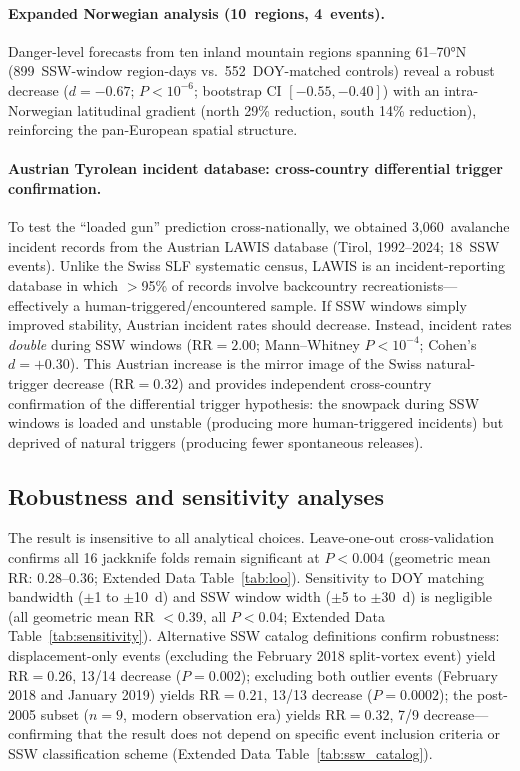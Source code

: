 \documentclass[11pt,letterpaper]{article}
\begin{document}
\paragraph{Expanded Norwegian analysis (10~regions, 4~events).} Danger-level forecasts from ten inland mountain regions spanning 61--70°N (899~SSW-window region-days vs.\ 552~DOY-matched controls) reveal a robust decrease ($d = -0.67$; $P < 10^{-6}$; bootstrap CI $[-0.55, -0.40]$) with an intra-Norwegian latitudinal gradient (north 29\% reduction, south 14\% reduction), reinforcing the pan-European spatial structure.

\paragraph{Austrian Tyrolean incident database: cross-country differential trigger confirmation.} To test the ``loaded gun'' prediction cross-nationally, we obtained 3,060~avalanche incident records from the Austrian LAWIS database (Tirol, 1992--2024; 18~SSW events). Unlike the Swiss SLF systematic census, LAWIS is an incident-reporting database in which $>$95\% of records involve backcountry recreationists---effectively a human-triggered/encountered sample. If SSW windows simply improved stability, Austrian incident rates should decrease. Instead, incident rates \emph{double} during SSW windows ($\mathrm{RR} = 2.00$; Mann--Whitney $P < 10^{-4}$; Cohen's $d = +0.30$). This Austrian increase is the mirror image of the Swiss natural-trigger decrease ($\mathrm{RR} = 0.32$) and provides independent cross-country confirmation of the differential trigger hypothesis: the snowpack during SSW windows is loaded and unstable (producing more human-triggered incidents) but deprived of natural triggers (producing fewer spontaneous releases).

\subsection{Robustness and sensitivity analyses}

The result is insensitive to all analytical choices. Leave-one-out cross-validation confirms all 16 jackknife folds remain significant at $P < 0.004$ (geometric mean RR: 0.28--0.36; Extended Data Table~\ref{tab:loo}). Sensitivity to DOY matching bandwidth ($\pm$1 to $\pm$10~d) and SSW window width ($\pm$5 to $\pm$30~d) is negligible (all geometric mean RR $< 0.39$, all $P < 0.04$; Extended Data Table~\ref{tab:sensitivity}). Alternative SSW catalog definitions confirm robustness: displacement-only events (excluding the February 2018 split-vortex event) yield $\mathrm{RR} = 0.26$, 13/14 decrease ($P = 0.002$); excluding both outlier events (February 2018 and January 2019) yields $\mathrm{RR} = 0.21$, 13/13 decrease ($P = 0.0002$); the post-2005 subset ($n = 9$, modern observation era) yields $\mathrm{RR} = 0.32$, 7/9 decrease---confirming that the result does not depend on specific event inclusion criteria or SSW classification scheme (Extended Data Table~\ref{tab:ssw_catalog}).
\end{document}

